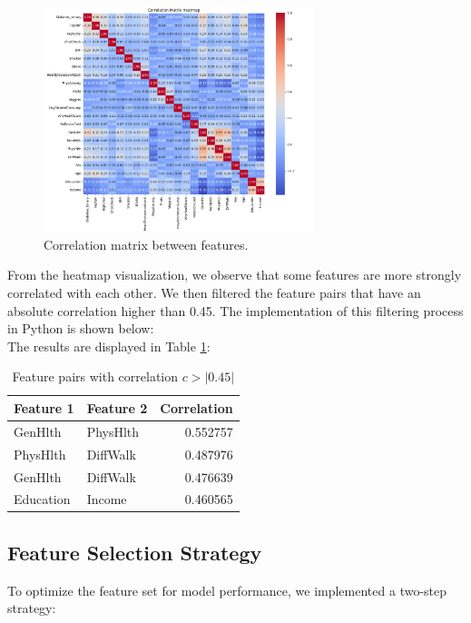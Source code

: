 

\begin{figure}[H]
    \centering
    \includegraphics[width=0.7\textwidth]{images/diabetes_correlation_matrix.png}
    \caption{Correlation matrix between features.}
    \label{fig:correlation-matrix}
\end{figure}

From the heatmap visualization, we observe that some features are more strongly correlated with each other. We then filtered the feature pairs that have an absolute correlation higher than 0.45. The implementation of this filtering process in Python is shown below:
\\


The results are displayed in Table \ref{table:correlation-filtered}:

\begin{table}[ht]
\centering
\begin{tabular}{ |l|l|r| }
\hline
\textbf{Feature 1} & \textbf{Feature 2} & \textbf{Correlation} \\
\hline
GenHlth    & PhysHlth   & 0.552757 \\
PhysHlth   & DiffWalk   & 0.487976 \\
GenHlth    & DiffWalk   & 0.476639 \\
Education  & Income     & 0.460565 \\
\hline
\end{tabular}
\caption{Feature pairs with correlation $c > |0.45|$}
\label{table:correlation-filtered}
\end{table}

\subsection*{Feature Selection Strategy}
To optimize the feature set for model performance, we implemented a two-step strategy:

